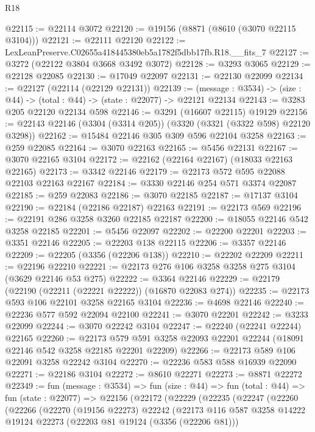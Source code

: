 \begin{lexlean}{R18}
\begin{coremodule}
@22115 := @22114 @3072
@22120 := @19156 (@8871 (@8610 (@3070 @22115 @3104)))
@22121 := @22111 @22120
@22122 := LexLeanPreserve.C02655a418445380eb5a1782f5dbb17fb.R18.__fits_7
@22127 := @3272 (@22122 @3804 @3668 @3492 @3072)
@22128 := @3293 @3065
@22129 := @22128 @22085
@22130 := @17049 @22097
@22131 := @22130 @22099
@22134 := @22127 (@22114 (@22129 @22131))
@22139 := (message : @3534) -> (size : @44) -> (total : @44) -> (state : @22077) -> @22121 @22134
@22143 := @3283 @205 @22120 @22134 @598
@22146 := @3291 (@16607 @22115) @19129
@22156 := @22143 @22146 (@3304 (@3314 @205)) (@3320 (@3321 (@3322 @598) @22120 @3298))
@22162 := @15484 @22146 @305 @309 @596 @22104 @3258
@22163 := @259 @22085
@22164 := @3070 @22163
@22165 := @5456 @22131
@22167 := @3070 @22165 @3104
@22172 := @22162 (@22164 @22167) (@18033 @22163 @22165)
@22173 := @3342 @22146
@22179 := @22173 @572 @595 @22088 @22103 @22163 @22167
@22184 := @3330 @22146 @254 @571 @3374 @22087
@22185 := @259 @22083
@22186 := @3070 @22185
@22187 := @17137 @3104
@22190 := @22184 (@22186 @22187) @22163
@22191 := @22173 @569
@22196 := @22191 @286 @3258 @3260 @22185 @22187
@22200 := @18055 @22146 @542 @3258 @22185
@22201 := @5456 @22097
@22202 := @22200 @22201
@22203 := @3351 @22146
@22205 := @22203 @138 @22115
@22206 := @3357 @22146
@22209 := @22205 (@3356 (@22206 @138))
@22210 := @22202 @22209
@22211 := @22196 @22210
@22221 := @22173 @276 @106 @3258 @3258 @275 @3104 (@3629 @22146 @53 @275)
@22222 := @3364 @22146
@22229 := @22179 (@22190 (@22211 (@22221 @22222)) (@16870 @22083 @274))
@22235 := @22173 @593 @106 @22101 @3258 @22165 @3104
@22236 := @4698 @22146
@22240 := @22236 @577 @592 @22094 @22100
@22241 := @3070 @22201
@22242 := @3233 @22099
@22244 := @3070 @22242 @3104
@22247 := @22240 (@22241 @22244) @22165
@22260 := @22173
    @579
    @591
    @3258
    @22093
    @22201
    @22244
    (@18091 @22146 @542 @3258 @22185 @22201 @22209)
@22266 := @22173 @589 @106 @22091 @3258 @22242 @3104
@22270 := @22236 @583 @588 @16939 @22090
@22271 := @22186 @3104
@22272 := @8610 @22271
@22273 := @8871 @22272
@22349 := fun (message : @3534) =>
  fun (size : @44) =>
  fun (total : @44) =>
  fun (state : @22077) =>
  @22156
    (@22172
      (@22229
        (@22235
          (@22247
            (@22260
              (@22266
                (@22270
                  (@19156 @22273)
                  @22242
                  (@22173
                    @116
                    @587
                    @3258
                    @14222
                    @19124
                    @22273
                    (@22203 @81 @19124 (@3356 (@22206 @81)))

\end{coremodule}
\end{lexlean}
